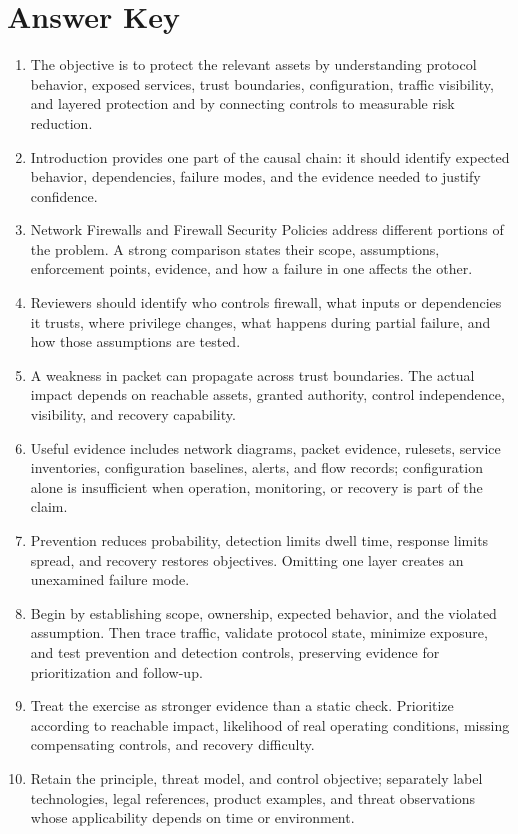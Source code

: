 \documentclass[11pt]{article}
\begin{document}
\section*{Answer Key}
\begin{enumerate}
\item The objective is to protect the relevant assets by understanding protocol behavior, exposed services, trust boundaries, configuration, traffic visibility, and layered protection and by connecting controls to measurable risk reduction.
\item Introduction provides one part of the causal chain: it should identify expected behavior, dependencies, failure modes, and the evidence needed to justify confidence.
\item Network Firewalls and Firewall Security Policies address different portions of the problem. A strong comparison states their scope, assumptions, enforcement points, evidence, and how a failure in one affects the other.
\item Reviewers should identify who controls firewall, what inputs or dependencies it trusts, where privilege changes, what happens during partial failure, and how those assumptions are tested.
\item A weakness in packet can propagate across trust boundaries. The actual impact depends on reachable assets, granted authority, control independence, visibility, and recovery capability.
\item Useful evidence includes network diagrams, packet evidence, rulesets, service inventories, configuration baselines, alerts, and flow records; configuration alone is insufficient when operation, monitoring, or recovery is part of the claim.
\item Prevention reduces probability, detection limits dwell time, response limits spread, and recovery restores objectives. Omitting one layer creates an unexamined failure mode.
\item Begin by establishing scope, ownership, expected behavior, and the violated assumption. Then trace traffic, validate protocol state, minimize exposure, and test prevention and detection controls, preserving evidence for prioritization and follow-up.
\item Treat the exercise as stronger evidence than a static check. Prioritize according to reachable impact, likelihood of real operating conditions, missing compensating controls, and recovery difficulty.
\item Retain the principle, threat model, and control objective; separately label technologies, legal references, product examples, and threat observations whose applicability depends on time or environment.
\end{enumerate}
\end{document}
